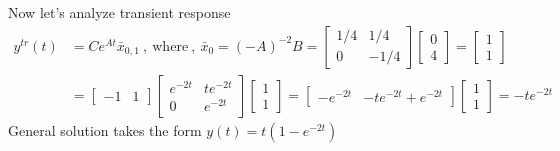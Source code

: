 \documentclass[twoside]{article}
\begin{document}
Now let's analyze transient response
\begin{align*} 
y^{tr}(t) &= C e^{A t} \bar{x}_{0,1} \ , \ \mathrm{where} \ , \  \bar{x}_0 = \left(-A \right)^{-2} B = \begin{bmatrix} 1/4 & 1/4 \\ 0 & -1/4 \end{bmatrix}  \begin{bmatrix} 0 \\ 4 \end{bmatrix} = \begin{bmatrix} 1 \\ 1 \end{bmatrix} 
\\[1ex]
&= \begin{bmatrix} -1 & 1 \end{bmatrix} \begin{bmatrix} e^{-2 t} & t e^{-2 t} \\ 0 &e^{-2 t} \end{bmatrix} \begin{bmatrix} 1 \\ 1 \end{bmatrix} 
= \begin{bmatrix} -e^{-2 t} & -t e^{-2 t} + e^{-2 t} \end{bmatrix} \begin{bmatrix} 1 \\ 1 \end{bmatrix}  
= - t e^{-2 t} 
\end{align*}
%
General solution takes the form $y(t) = t \left(1 - e^{-2 t} \right)$
\end{document}

